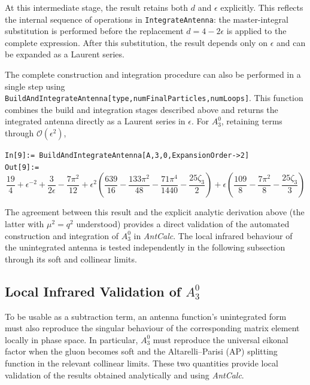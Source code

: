 At this intermediate stage, the result retains both $d$ and $\epsilon$ explicitly. This reflects the
internal sequence of operations in \texttt{IntegrateAntenna}: the master-integral substitution is
performed before the replacement $d=4-2\epsilon$ is applied to the complete expression. After this
substitution, the result depends only on $\epsilon$ and can be expanded as a Laurent series.

The complete construction and integration procedure can also be performed in a single step using
\texttt{BuildAndIntegrateAntenna[type,numFinalParticles,numLoops]}. This function combines the build
and integration stages described above and returns the integrated antenna directly as a Laurent
series in $\epsilon$. For $A_3^0$, retaining terms through $\mathcal O(\epsilon^2)$,

\begin{mdframed}[backgroundcolor=gray!10, linewidth=0pt]
    \texttt{In[9]:= BuildAndIntegrateAntenna[A,3,0,ExpansionOrder->2]}\\
    \hfill
    \texttt{Out[9]:=}
        \begin{equation*}
            \frac{19}{4}+\epsilon^{-2}+\frac3{2\epsilon}-\frac{7\pi^2}{12}+\epsilon^2\left(\frac{639}{16}-\frac{133\pi^2}{48}-\frac{71\pi^4}{1440}-\frac{25\zeta_3}{2}\right)+\epsilon\left(\frac{109}{8}-\frac{7\pi^2}{8}-\frac{25\zeta_3}{3}\right)
        \end{equation*}
\end{mdframed}

The agreement between this result and the explicit analytic derivation above (the latter with $\mu^2=q^2$ understood) provides a direct
validation of the automated construction and integration of $A_3^0$ in \textit{AntCalc}. The local
infrared behaviour of the unintegrated antenna is tested independently in the following subsection
through its soft and collinear limits.


\subsection{Local Infrared Validation of $A_3^0$}\label{subsec:a30LocalValidation}

To be usable as a subtraction term, an antenna function's unintegrated form must also
reproduce the singular behaviour of the corresponding matrix element locally in phase 
space. In particular, $A_3^0$ must reproduce the universal eikonal factor when the gluon 
becomes soft and the Altarelli--Parisi (AP) splitting function in the relevant collinear limits. 
These two quantities provide local validation of the results obtained analytically
and using \textit{AntCalc}. 

